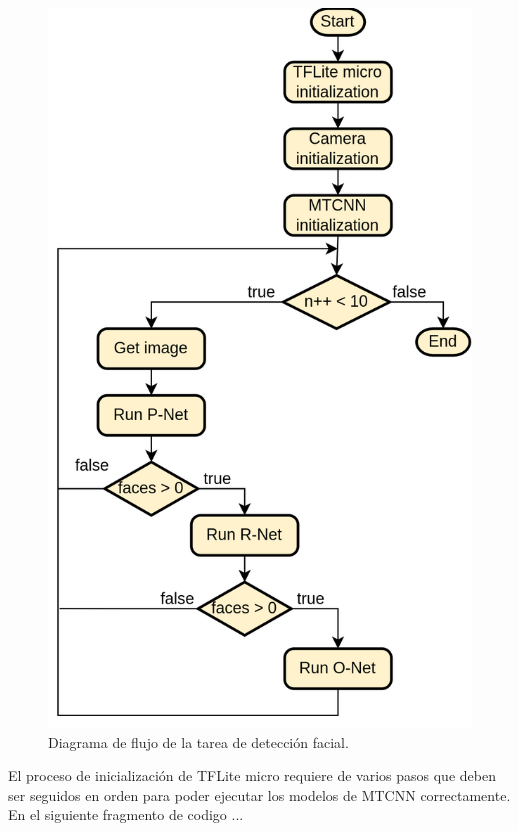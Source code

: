 \begin{figure}[h]
	\centering
	\includegraphics[scale=0.22]{./Figures/fw_detection_flow.png}
	\caption{Diagrama de flujo de la tarea de detección facial.}
	\label{fig:fw_detect_flow}
\end{figure}

El proceso de inicialización de TFLite micro requiere de varios pasos que deben ser seguidos en orden para poder ejecutar los modelos de MTCNN correctamente. En el siguiente fragmento de codigo ...


